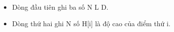 \begin{itemize}
	\item Dòng đầu tiên ghi ba số N L D.
	\item Dòng thứ hai ghi N số H[i] là độ cao của điểm thứ i.
\end{itemize}